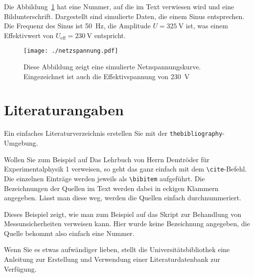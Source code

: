 \documentclass[11pt,a4paper]{article}
\begin{document}
Die Abbildung~\ref{fig:eineAbbildung} hat eine Nummer, auf die im Text verwiesen wird und eine Bildunterschrift. Dargestellt sind simulierte Daten, die einem Sinus entsprechen. Die Frequenz des Sinus ist 50~Hz, die Amplitude $U=325\ \mathrm{V}$ ist, was einem Effektivwert von $U_\mathrm{eff} = 230\ \mathrm{V}$ entspricht.
\begin{figure}[b]
    \centering
    \texttt{[image: ./netzspannung.pdf]}
    \caption{Diese Abbildung zeigt eine simulierte Netzspannungskurve. Eingezeichnet ist auch die Effektivspannung von 230~V}
    \label{fig:eineAbbildung}
\end{figure}

\section{Literaturangaben}
Ein einfaches Literaturverzeichnis erstellen Sie mit der \verb!thebibliography!-Umgebung.

Wollen Sie zum Beispiel auf Das Lehrbuch von Herrn Demtröder für Experimentalphysik 1\cite{demtr1} verweisen, so geht das ganz einfach mit dem \verb!\cite!-Befehl. Die einzelnen Einträge werden jeweils als \verb!\bibitem! aufgeführt. Die Bezeichnungen der Quellen im Text werden dabei in eckigen Klammern angegeben. Lässt man diese weg, werden die Quellen einfach durchnummeriert.

Dieses Beispiel zeigt, wie man zum Beispiel auf das Skript zur Behandlung von Messunsicherheiten\cite{ABW} verweisen kann. Hier wurde keine Bezeichnung angegeben, die Quelle bekommt also einfach eine Nummer.

Wenn Sie es etwas aufwändiger lieben, stellt die Universitätsbibliothek eine Anleitung zur Erstellung und Verwendung einer Literaturdatenbank\cite{mediatum} zur Verfügung. 

\begin{thebibliography}{Ddddd} %


\end{thebibliography}
\end{document}
